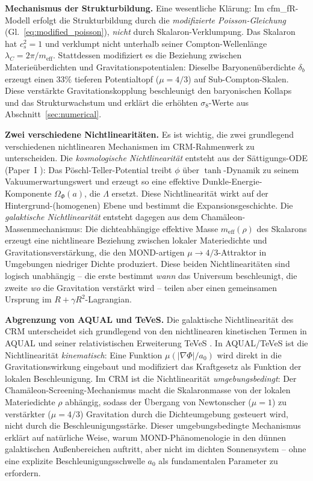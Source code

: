 \documentclass[11pt,a4paper]{article}
\begin{document}
\textbf{Mechanismus der Strukturbildung.} Eine wesentliche Kl\"arung: Im cfm\_fR-Modell erfolgt die Strukturbildung durch die \textit{modifizierte Poisson-Gleichung} (Gl.~\ref{eq:modified_poisson}), \textit{nicht} durch Skalaron-Verklumpung. Das Skalaron hat $c_s^2 = 1$ und verklumpt nicht unterhalb seiner Compton-Wellenl\"ange $\lambda_C = 2\pi/m_{\mathrm{eff}}$. Stattdessen modifiziert es die Beziehung zwischen Materie\"uberdichten und Gravitationspotentialen: Dieselbe Baryonen\"uberdichte $\delta_b$ erzeugt einen $33\%$ tieferen Potentialtopf ($\mu = 4/3$) auf Sub-Compton-Skalen. Diese verst\"arkte Gravitationskopplung beschleunigt den baryonischen Kollaps und das Strukturwachstum und erkl\"art die erh\"ohten $\sigma_8$-Werte aus Abschnitt~\ref{sec:numerical}.

\textbf{Zwei verschiedene Nichtlinearit\"aten.} Es ist wichtig, die zwei grundlegend verschiedenen nichtlinearen Mechanismen im CRM-Rahmenwerk zu unterscheiden. Die \textit{kosmologische Nichtlinearit\"at} entsteht aus der S\"attigungs-ODE (Paper~I \cite{Geiger2026}): Das P\"oschl-Teller-Potential treibt $\phi$ \"uber $\tanh$-Dynamik zu seinem Vakuumerwartungswert und erzeugt so eine effektive Dunkle-Energie-Komponente $\Omega_\Phi(a)$, die $\Lambda$ ersetzt. Diese Nichtlinearit\"at wirkt auf der Hintergrund-(homogenen) Ebene und bestimmt die Expansionsgeschichte. Die \textit{galaktische Nichtlinearit\"at} entsteht dagegen aus dem Cham\"aleon-Massenmechanismus: Die dichteabh\"angige effektive Masse $m_{\mathrm{eff}}(\rho)$ des Skalarons erzeugt eine nichtlineare Beziehung zwischen lokaler Materiedichte und Gravitationsverst\"arkung, die den MOND-artigen $\mu \to 4/3$-Attraktor in Umgebungen niedriger Dichte produziert. Diese beiden Nichtlinearit\"aten sind logisch unabh\"angig -- die erste bestimmt \textit{wann} das Universum beschleunigt, die zweite \textit{wo} die Gravitation verst\"arkt wird -- teilen aber einen gemeinsamen Ursprung im $R + \gamma R^2$-Lagrangian.

\textbf{Abgrenzung von AQUAL und TeVeS.} Die galaktische Nichtlinearit\"at des CRM unterscheidet sich grundlegend von den nichtlinearen kinetischen Termen in AQUAL \cite{BekensteinMilgrom1984} und seiner relativistischen Erweiterung TeVeS \cite{Bekenstein2004}. In AQUAL/TeVeS ist die Nichtlinearit\"at \textit{kinematisch}: Eine Funktion $\mu(|\nabla\Phi|/a_0)$ wird direkt in die Gravitationswirkung eingebaut und modifiziert das Kraftgesetz als Funktion der lokalen Beschleunigung. Im CRM ist die Nichtlinearit\"at \textit{umgebungsbedingt}: Der Cham\"aleon-Screening-Mechanismus macht die Skalaronmasse von der lokalen Materiedichte $\rho$ abh\"angig, sodass der \"Ubergang von Newtonscher ($\mu = 1$) zu verst\"arkter ($\mu = 4/3$) Gravitation durch die Dichteumgebung gesteuert wird, nicht durch die Beschleunigungsst\"arke. Dieser umgebungsbedingte Mechanismus erkl\"art auf nat\"urliche Weise, warum MOND-Ph\"anomenologie in den d\"unnen galaktischen Au\ss{}enbereichen auftritt, aber nicht im dichten Sonnensystem -- ohne eine explizite Beschleunigungsschwelle $a_0$ als fundamentalen Parameter zu erfordern.
\end{document}
